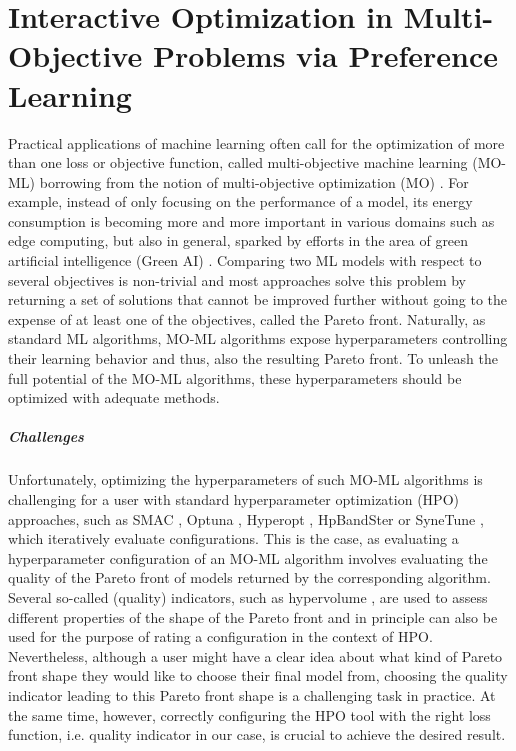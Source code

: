 \chapter{Interactive Optimization in Multi-Objective Problems via Preference Learning}
\label{human-centric-chap:moo}

Practical applications of machine learning often call for the optimization of more than one loss or objective function, called multi-objective machine learning (MO-ML) \cite{jin-momlbook06a} borrowing from the notion of multi-objective optimization (MO) \cite{deb-ds16,gunantara-ce18}.
For example, instead of only focusing on the performance of a model, its energy consumption is becoming more and more important in various domains such as edge computing, but also in general, sparked by efforts in the area of green artificial intelligence (Green AI) \cite{schwartz-arxiv19a,wynsberghe-aiethics21a}.
Comparing two ML models with respect to several objectives is non-trivial and most approaches solve this problem by returning a set of solutions that cannot be improved further without going to the expense of at least one of the objectives, called the Pareto front.
Naturally, as standard ML algorithms, MO-ML algorithms expose hyperparameters controlling their learning behavior and thus, also the resulting Pareto front.
To unleash the full potential of the MO-ML algorithms, these hyperparameters should be optimized with adequate methods.

\paragraph{Challenges} Unfortunately, optimizing the hyperparameters of such MO-ML algorithms is challenging for a user with standard hyperparameter optimization (HPO) \cite{feurer-automlbook19a,bischl-dmkd23a} approaches, such as SMAC \cite{hutter-lion11a,lindauer-jmlr22a}, Optuna \cite{akiba-kdd19a}, Hyperopt \cite{komer-scipy14a}, HpBandSter \cite{falkner-icml18a} or SyneTune \cite{salinas-automl22}, which iteratively evaluate configurations.
This is the case, as evaluating a hyperparameter configuration of an MO-ML algorithm involves evaluating the quality of the Pareto front of models returned by the corresponding algorithm.
Several so-called (quality) indicators, such as hypervolume \cite{zitzler1999multiobjective}, are used to assess different properties of the shape of the Pareto front and in principle can also be used for the purpose of rating a configuration in the context of HPO.
Nevertheless, although a user might have a clear idea about what kind of Pareto front shape they would like to choose their final model from, choosing the quality indicator leading to this Pareto front shape is a challenging task in practice. At the same time, however, correctly configuring the HPO tool with the right loss function, i.e. quality indicator in our case, is crucial to achieve the desired result.

